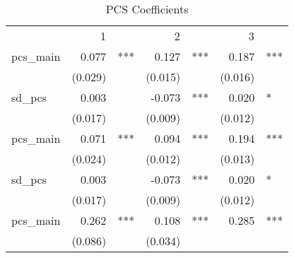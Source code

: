 \begin{table}[!h]
\caption{PCS Coefficients}
\centering
\begin{tabular}{lllllll}
\cline{1-7}
\multicolumn{1}{r}{} &
  \multicolumn{2}{c}{1} &
  \multicolumn{2}{c}{2} &
  \multicolumn{2}{c}{3} \\
\cline{1-7}
\multicolumn{1}{l}{pcs\_main} &
  \multicolumn{1}{r}{0.077} &
  \multicolumn{1}{l}{***} &
  \multicolumn{1}{r}{0.127} &
  \multicolumn{1}{l}{***} &
  \multicolumn{1}{r}{0.187} &
  \multicolumn{1}{l}{***} \\
\multicolumn{1}{l}{} &
  \multicolumn{1}{r}{(0.029)} &
  \multicolumn{1}{l}{} &
  \multicolumn{1}{r}{(0.015)} &
  \multicolumn{1}{l}{} &
  \multicolumn{1}{r}{(0.016)} &
  \multicolumn{1}{l}{} \\
\multicolumn{1}{l}{sd\_pcs} &
  \multicolumn{1}{r}{0.003} &
  \multicolumn{1}{l}{} &
  \multicolumn{1}{r}{-0.073} &
  \multicolumn{1}{l}{***} &
  \multicolumn{1}{r}{0.020} &
  \multicolumn{1}{l}{*} \\
\multicolumn{1}{l}{} &
  \multicolumn{1}{r}{(0.017)} &
  \multicolumn{1}{l}{} &
  \multicolumn{1}{r}{(0.009)} &
  \multicolumn{1}{l}{} &
  \multicolumn{1}{r}{(0.012)} &
  \multicolumn{1}{l}{} \\
\multicolumn{1}{l}{pcs\_main} &
  \multicolumn{1}{r}{0.071} &
  \multicolumn{1}{l}{***} &
  \multicolumn{1}{r}{0.094} &
  \multicolumn{1}{l}{***} &
  \multicolumn{1}{r}{0.194} &
  \multicolumn{1}{l}{***} \\
\multicolumn{1}{l}{} &
  \multicolumn{1}{r}{(0.024)} &
  \multicolumn{1}{l}{} &
  \multicolumn{1}{r}{(0.012)} &
  \multicolumn{1}{l}{} &
  \multicolumn{1}{r}{(0.013)} &
  \multicolumn{1}{l}{} \\
\multicolumn{1}{l}{sd\_pcs} &
  \multicolumn{1}{r}{0.003} &
  \multicolumn{1}{l}{} &
  \multicolumn{1}{r}{-0.073} &
  \multicolumn{1}{l}{***} &
  \multicolumn{1}{r}{0.020} &
  \multicolumn{1}{l}{*} \\
\multicolumn{1}{l}{} &
  \multicolumn{1}{r}{(0.017)} &
  \multicolumn{1}{l}{} &
  \multicolumn{1}{r}{(0.009)} &
  \multicolumn{1}{l}{} &
  \multicolumn{1}{r}{(0.012)} &
  \multicolumn{1}{l}{} \\
\multicolumn{1}{l}{pcs\_main} &
  \multicolumn{1}{r}{0.262} &
  \multicolumn{1}{l}{***} &
  \multicolumn{1}{r}{0.108} &
  \multicolumn{1}{l}{***} &
  \multicolumn{1}{r}{0.285} &
  \multicolumn{1}{l}{***} \\
\multicolumn{1}{l}{} &
  \multicolumn{1}{r}{(0.086)} &
  \multicolumn{1}{l}{} &
  \multicolumn{1}{r}{(0.034)} &

\end{tabular}
\end{table}
